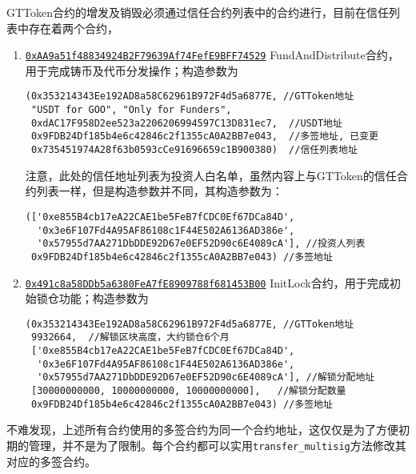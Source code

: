 \documentclass[12pt]{article}
\newcommand{\ethaddr}[1]{{\href{https://etherscan.io/address/#1}{\texttt{#1}}}}
\begin{document}
GTToken合约的增发及销毁必须通过信任合约列表中的合约进行，目前在信任列表中存在着两个合约，
\begin{enumerate}
\item \ethaddr{0xAA9a51f48834924B2F79639Af74FefE9BFF74529} FundAndDistribute合约，用于完成铸币及代币分发操作；构造参数为
\begin{verbatim}
(0x353214343Ee192AD8a58C62961B972F4d5a6877E, //GTToken地址
 "USDT for GOO", "Only for Funders", 
 0xdAC17F958D2ee523a2206206994597C13D831ec7,  //USDT地址  
 0x9FDB24Df185b4e6c42846c2f1355cA0A2BB7e043,  //多签地址, 已变更
 0x735451974A28f63b0593cCe91696659c1B900380)  //信任列表地址
\end{verbatim}
注意，此处的信任地址列表为投资人白名单，虽然内容上与GTToken的信任合约列表一样，但是构造参数并不同，其构造参数为：
\begin{verbatim}
(['0xe855B4cb17eA22CAE1be5FeB7fCDC0Ef67DCa84D',
  '0x3e6F107Fd4A95AF86108c1F44E502A6136AD386e',
  '0x57955d7AA271DbDDE92D67e0EF52D90c6E4089cA'], //投资人列表
 0x9FDB24Df185b4e6c42846c2f1355cA0A2BB7e043) //多签地址
\end{verbatim}

\item \ethaddr{0x491c8a58DDb5a6380FeA7fE8909788f681453B00} InitLock合约，用于完成初始锁仓功能；构造参数为
\begin{verbatim}
(0x353214343Ee192AD8a58C62961B972F4d5a6877E, //GTToken地址
 9932664,  //解锁区块高度，大约锁仓6个月
 ['0xe855B4cb17eA22CAE1be5FeB7fCDC0Ef67DCa84D',
  '0x3e6F107Fd4A95AF86108c1F44E502A6136AD386e',
  '0x57955d7AA271DbDDE92D67e0EF52D90c6E4089cA'], //解锁分配地址
 [30000000000, 10000000000, 10000000000],   //解锁分配数量
 0x9FDB24Df185b4e6c42846c2f1355cA0A2BB7e043) //多签地址
\end{verbatim}
\end{enumerate}

不难发现，上述所有合约使用的多签合约为同一个合约地址，这仅仅是为了方便初期的管理，并不是为了限制。每个合约都可以实用\texttt{transfer\_multisig}方法修改其对应的多签合约。

\newpage
\begin{appendices}

%
\end{appendices}
\end{document}

